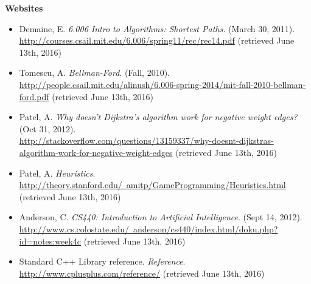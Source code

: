 \documentclass[11pt]{article}
\begin{document}
\noindent \textbf{Websites}
\begin{itemize}
\item Demaine, E. \textit{6.006 Intro to Algorithms: Shortest Paths.} (March 30, 2011).\\\href{http://courses.csail.mit.edu/6.006/spring11/rec/rec14.pdf}{http://courses.csail.mit.edu/6.006/spring11/rec/rec14.pdf} (retrieved June 13th, 2016)

\item Tomescu, A. \textit{Bellman-Ford}. (Fall, 2010).\\\href{http://people.csail.mit.edu/alinush/6.006-spring-2014/mit-fall-2010-bellman-ford.pdf}{http://people.csail.mit.edu/alinush/6.006-spring-2014/mit-fall-2010-bellman-ford.pdf} (retrieved June 13th, 2016)

\item \sloppy Patel, A. \textit{Why doesn't Dijkstra's algorithm work for negative weight edges?} (Oct 31, 2012).\\\href{http://stackoverflow.com/questions/13159337/why-doesnt-dijkstras-algorithm-work-for-negative-weight-edges}{http://stackoverflow.com/questions/13159337/why-doesnt-dijkstras-algorithm-work-for-negative-weight-edges} (retrieved June 13th, 2016)

\item Patel, A. \textit{Heuristics}.\\\href{http://theory.stanford.edu/~amitp/GameProgramming/Heuristics.html}{http://theory.stanford.edu/~amitp/GameProgramming/Heuristics.html} (retrieved June 13th, 2016)

\item Anderson, C. \textit{CS440: Introduction to Artificial Intelligence}. (Sept 14, 2012).\\\href{http://www.cs.colostate.edu/~anderson/cs440/index.html/doku.php?id=notes:week4c}{http://www.cs.colostate.edu/~anderson/cs440/index.html/doku.php?id=notes:week4c} (retrieved June 13th, 2016)

\item Standard C++ Library reference. \textit{Reference}.\\\href{http://www.cplusplus.com/reference/}{http://www.cplusplus.com/reference/} (retrieved June 13th, 2016)

\end{itemize}






\newpage
\end{document}
